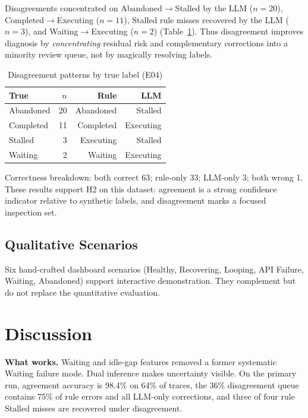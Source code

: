 \documentclass[conference]{IEEEtran}
\begin{document}
Disagreements concentrated on Abandoned$\rightarrow$Stalled by the LLM ($n{=}20$),
Completed$\rightarrow$Executing ($n{=}11$), Stalled rule misses recovered by the LLM
($n{=}3$), and Waiting$\rightarrow$Executing ($n{=}2$) (Table~\ref{tab:disagree_class}).
Thus disagreement improves diagnosis by \emph{concentrating} residual risk and
complementary corrections into a minority review queue, not by magically resolving labels.

\begin{table}[H]
\caption{Disagreement patterns by true label (E04)}
\label{tab:disagree_class}
\centering
\small
\begin{tabular}{@{}lrrr@{}}
\toprule
True & $n$ & Rule & LLM \\ \midrule
Abandoned & 20 & Abandoned & Stalled \\
Completed & 11 & Completed & Executing \\
Stalled & 3 & Executing & Stalled \\
Waiting & 2 & Waiting & Executing \\ \bottomrule
\end{tabular}
\end{table}

Correctness breakdown: both correct 63; rule-only 33; LLM-only 3; both wrong 1. These
results support H2 on this dataset: agreement is a strong confidence indicator relative to
synthetic labels, and disagreement marks a focused inspection set.

\subsection{Qualitative Scenarios}

Six hand-crafted dashboard scenarios (Healthy, Recovering, Looping, API Failure, Waiting,
Abandoned) support interactive demonstration. They complement but do not replace the
quantitative evaluation.

\section{Discussion}

\textbf{What works.} Waiting and idle-gap features removed a former systematic Waiting
failure mode. Dual inference makes uncertainty visible. On the primary run, agreement
accuracy is 98.4\% on 64\% of traces, the 36\% disagreement queue contains 75\% of rule
errors and all LLM-only corrections, and three of four rule Stalled misses are recovered
under disagreement.
\end{document}
